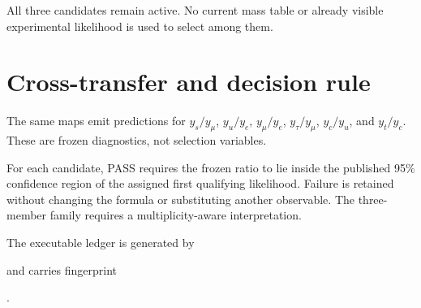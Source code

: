 All three candidates remain active.  No current mass table or already visible
experimental likelihood is used to select among them.

\section{Cross-transfer and decision rule}

The same maps emit predictions for $y_s/y_\mu$, $y_u/y_e$, $y_\mu/y_e$,
$y_\tau/y_\mu$, $y_c/y_u$, and $y_t/y_c$.  These are frozen diagnostics, not
selection variables.

For each candidate, PASS requires the frozen ratio to lie inside the published
95\% confidence region of the assigned first qualifying likelihood.  Failure is
retained without changing the formula or substituting another observable.  The
three-member family requires a multiplicity-aware interpretation.

The executable ledger is generated by


and carries fingerprint

.
